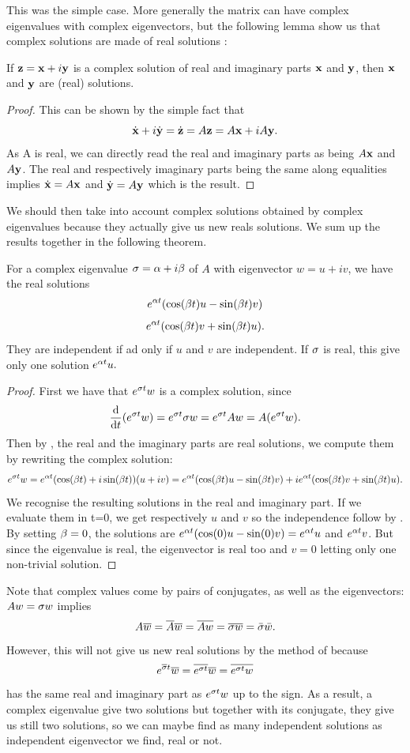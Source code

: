 This was the simple case. More generally the matrix can have complex eigenvalues with complex eigenvectors, but the following lemma show us that complex solutions are made of real solutions :
\begin{lemme} \label{lem:complex}
If $\mathbf{z}=\mathbf{x}+i\mathbf{y}$ is a complex solution of real and imaginary parts $\mathbf{x}$ and $\mathbf{y}$, then $\mathbf{x}$ and $\mathbf{y}$ are (real) solutions.
\end{lemme}
\begin{proof}
This can be shown by the simple fact that
\[\dot{\mathbf{x}}+i\dot{\mathbf{y}} =\dot{\mathbf{z}} = A\mathbf{z} = A\mathbf{x}+iA\mathbf{y}. \]
As A is real, we can directly read the real and imaginary parts as being $A\mathbf{x}$ and $A\mathbf{y}$. The real and respectively imaginary parts being the same along equalities implies $\dot{\mathbf{x}}=A\mathbf{x}$ and $\dot{\mathbf{y}}=A\mathbf{y}$ which is the result.
\end{proof}
We should then take into account complex solutions obtained by complex eigenvalues because they actually give us new reals solutions. We sum up the results together in the following theorem.
\begin{theoreme} \label{th:eigensolutions}
For a complex eigenvalue $\sigma=\alpha+i\beta$ of $A$ with eigenvector $w=u+iv$, we have the real solutions
\[e^{\alpha t}(\cos(\beta t)u - \sin(\beta t)v)\] 
\[e^{\alpha t}(\cos(\beta t)v + \sin(\beta t)u).\] 
They are independent if ad only if $u$ and $v$ are independent. If $\sigma$ is real, this give only one solution $e^{\alpha t}u.$
\end{theoreme}
\begin{proof}
First we have that $e^{\sigma t}w$ is a complex solution, since 
\[\frac{\mathrm{d}}{\mathrm{d} t}(e^{\sigma t}w) = e^{\sigma t}\sigma w = e^{\sigma t}Aw = A(e^{\sigma t}w).\]
Then by , the real and the imaginary parts are real solutions, we compute them by rewriting the complex solution:
\[e^{\sigma t}w = e^{\alpha t}(\cos(\beta t) + i\sin(\beta t))(u+iv)
= e^{\alpha t}(\cos(\beta t)u - \sin(\beta t)v) + ie^{\alpha t}(\cos(\beta t)v + \sin(\beta t)u).\]
We recognise the resulting solutions in the real and imaginary part. If we evaluate them in t=0, we get respectively $u$ and $v$ so the independence follow by . By setting $\beta=0$, the solutions are $e^{\alpha t}(\cos(0)u - \sin(0)v) = e^{\alpha t}u$ and  $e^{\alpha t}v$. But since the eigenvalue is real, the eigenvector is real too and $v=0$ letting only one non-trivial solution.
\end{proof}
\begin{remarque}
Note that complex values come by pairs of conjugates, as well as the eigenvectors:
$Aw=\sigma w$ implies 
$$A\overline{w} = \overline{A}\overline{w} = \overline{Aw}= \overline{\sigma w} = \bar{\sigma}\bar{w}.$$
However, this will not give us new real solutions by the method of  because $$e^{\overline{\sigma} t}\overline{w}= \overline{e^{\sigma t}}\overline{w} = \overline{e^{\sigma t}w}$$
has the same real and imaginary part as $e^{\sigma t}w$ up to the sign. As a result, a complex eigenvalue give two solutions but together with its conjugate, they give us still two solutions, so we can maybe find as many independent solutions as independent eigenvector we find, real or not.
\end{remarque}
